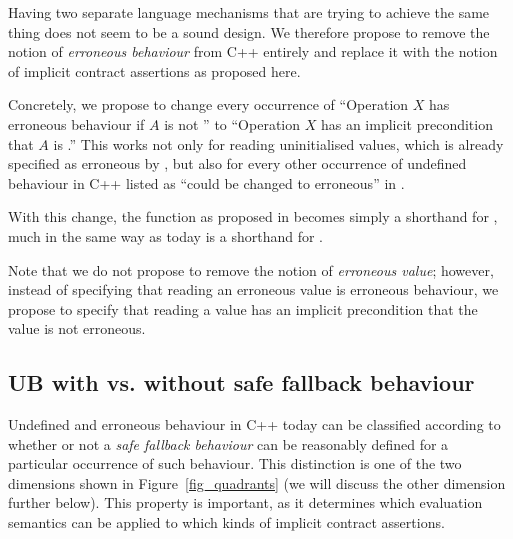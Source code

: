 Having two separate language mechanisms that are trying to achieve the same thing does not seem to be a sound design. We therefore propose to remove the notion of \emph{erroneous behaviour} from C++ entirely and replace it with the notion of implicit contract assertions as proposed here.

Concretely, we propose to change every occurrence of ``Operation $X$ has erroneous behaviour if $A$ is not '' to ``Operation $X$ has an implicit precondition that $A$ is .'' This works not only for reading uninitialised values, which is already specified as erroneous by \cite{P2795R5}, but also for every other occurrence of undefined behaviour in C++ listed as ``could be changed to erroneous'' in \cite{P2795R5}.

With this change, the function  as proposed in \cite{P3232R0} becomes simply a shorthand for , much in the same way as  today is a shorthand for .

Note that we do not propose to remove the notion of \emph{erroneous value}; however, instead of specifying that reading an erroneous value is erroneous behaviour, we propose to specify that reading a value has an implicit precondition that the value is not erroneous.

\subsection{UB with vs. without safe fallback behaviour}
\label{fallback}

Undefined and erroneous behaviour in C++ today can be classified according to whether or not a \emph{safe fallback behaviour} can be reasonably defined for a particular occurrence of such behaviour. This distinction is one of the two dimensions shown in Figure~\ref{fig_quadrants} (we will discuss the other dimension further below). This property is important, as it determines which evaluation semantics can be applied to which kinds of implicit contract assertions.

